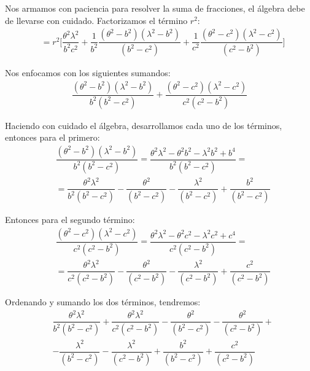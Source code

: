 Nos armamos con paciencia para resolver la suma de fracciones, el álgebra debe de llevarse con cuidado. Factorizamos el término $r^{2}$:
\begin{align*}
&= r^{2} \bigg[ \dfrac{\theta^{2} \lambda^{2}}{b^{2} c^{2}} + \dfrac{1}{b^{2}} \dfrac{(\theta^{2} - b^{2})(\lambda^{2} - b^{2})}{(b^{2} - c^{2})} + \dfrac{1}{c^{2}} \dfrac{(\theta^{2} - c^{2})(\lambda^{2} - c^{2})}{(c^{2} - b^{2})} \bigg]
\end{align*}

Nos enfocamos con los siguientes sumandos:
\begin{align*}
\dfrac{(\theta^{2} - b^{2})(\lambda^{2} - b^{2})}{b^{2}(b^{2} - c^{2})} + \dfrac{(\theta^{2} - c^{2})(\lambda^{2} - c^{2})}{c^{2}(c^{2} - b^{2})}
\end{align*}

Haciendo con cuidado el álgebra, desarrollamos cada uno de los términos, entonces para el primero:
\begin{align*}
&{}\dfrac{(\theta^{2} - b^{2})(\lambda^{2} - b^{2})}{b^{2}(b^{2} - c^{2})} = \dfrac{\theta^{2} \lambda^{2} - \theta^2 b^{2} - \lambda^{2} b^{2} + b^{4}}{b^{2}(b^{2} - c^{2})} = \\[0.5em] 
&= \dfrac{\theta^{2} \lambda^{2}}{b^{2}(b^{2} - c^{2})} - \dfrac{\theta^{2}}{(b^{2} - c^{2})} - \dfrac{\lambda^{2}}{(b^{2} - c^{2})} + \dfrac{b^{2}}{(b^{2} - c^{2})}
\end{align*}

Entonces para el segundo término:
\begin{align*}
&\dfrac{(\theta^{2} - c^{2})(\lambda^{2} - c^{2})}{c^{2}(c^{2} - b^{2})} = \dfrac{\theta^{2} \lambda^{2} - \theta^2 c^{2} - \lambda^{2} c^{2} + c^{4}}{c^{2}(c^{2} - b^{2})} = \\[0.5em] 
&= \dfrac{\theta^{2} \lambda^{2}}{c^{2}(c^{2} - b^{2})} - \dfrac{\theta^{2}}{(c^{2} - b^{2})} - \dfrac{\lambda^{2}}{(c^{2} - b^{2})} + \dfrac{c^{2}}{(c^{2} - b^{2})}
\end{align*}

Ordenando y sumando los dos términos, tendremos:
\begin{align*}
&\dfrac{\theta^{2} \lambda^{2}}{b^{2}(b^{2} - c^{2})} + \dfrac{\theta^{2} \lambda^{2}}{c^{2}(c^{2} - b^{2})} - \dfrac{\theta^{2}}{(b^{2} - c^{2})} - \dfrac{\theta^{2}}{(c^{2} - b^{2})} + \\[0.5em] 
&- \dfrac{\lambda^{2}}{(b^{2} - c^{2})} - \dfrac{\lambda^{2}}{(c^{2} - b^{2})} + \dfrac{b^{2}}{(b^{2} - c^{2})} + \dfrac{c^{2}}{(c^{2} - b^{2})}
\end{align*}

